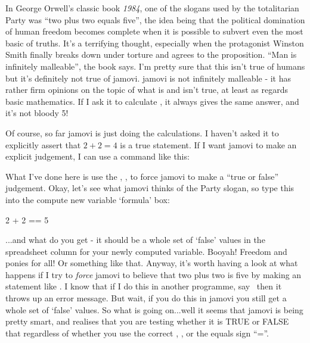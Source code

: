 In George Orwell's classic book {\it 1984}, one of the slogans used by the totalitarian Party was ``two plus two equals five'', the idea being that the political domination of human freedom becomes complete when it is possible to subvert even the most basic of truths. It's a terrifying thought, especially when the protagonist Winston Smith finally breaks down under torture and agrees to the proposition. ``Man is infinitely malleable'', the book says. I'm pretty sure that this isn't true of humans but it's definitely not true of jamovi. jamovi is not infinitely malleable - it has rather firm opinions on the topic of what is and isn't true, at least as regards basic mathematics. If I ask it to calculate , it always gives the same answer, and it's not bloody 5!

Of course, so far jamovi is just doing the calculations. I haven't asked it to explicitly assert that $2+2 = 4$ is a true statement. If I want jamovi to make an explicit judgement, I can use a command like this: 

What I've done here is use the , \rtext{==}, to force jamovi to make a ``true or false'' judgement. Okay, let's see what jamovi thinks of the Party slogan, so type this into the compute new variable `formula' box: 

\begin{rblock1}
2 + 2 == 5
\end{rblock1}

...and what do you get - it should be a whole set of `false' values in the spreadsheet column for your newly computed variable. Booyah! Freedom and ponies for all! Or something like that. Anyway, it's worth having a look at what happens if I try to {\it force} jamovi to believe that two plus two is five by making an statement like  . I know that if I do this in another programme, say \R\, then it throws up an error message. But wait, if you do this in jamovi you still get a whole set of `false' values. So what is going on...well it seems that jamovi is being pretty smart, and realises that you are testing whether it is TRUE or FALSE that  regardless of whether you use the correct , \rtext{==}, or the equals sign ``=''. 

